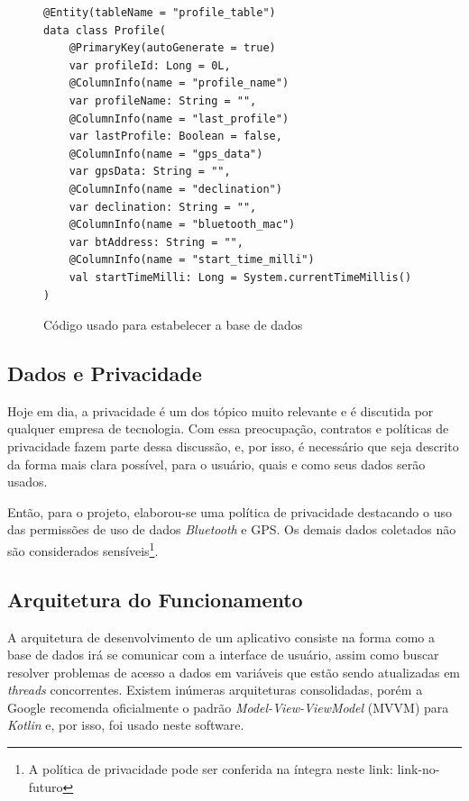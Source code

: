 \begin{figure}[htb]
	\centering
	\caption{Código usado para estabelecer a base de dados}
	\vspace{-15pt}
\begin{verbatim}
@Entity(tableName = "profile_table")
data class Profile(
	@PrimaryKey(autoGenerate = true)
	var profileId: Long = 0L,
	@ColumnInfo(name = "profile_name")
	var profileName: String = "",
	@ColumnInfo(name = "last_profile")
	var lastProfile: Boolean = false,
	@ColumnInfo(name = "gps_data")
	var gpsData: String = "",
	@ColumnInfo(name = "declination")
	var declination: String = "",
	@ColumnInfo(name = "bluetooth_mac")
	var btAddress: String = "",
	@ColumnInfo(name = "start_time_milli")
	val startTimeMilli: Long = System.currentTimeMillis()
)
\end{verbatim}

\label{code:database}
	\vspace{-20pt}
\end{figure}


\subsection{Dados e Privacidade}

Hoje em dia, a privacidade é um dos tópico muito relevante e é discutida por qualquer empresa de tecnologia. Com essa preocupação, contratos e políticas de privacidade fazem parte dessa discussão, e, por isso, é necessário que seja descrito da forma mais clara possível, para o usuário, quais e como seus dados serão usados.

Então, para o projeto, elaborou-se uma política de privacidade destacando o uso das permissões de uso de dados \textit{Bluetooth} e GPS. Os demais dados coletados não são considerados sensíveis\footnote{A política de privacidade pode ser conferida na íntegra neste link: link-no-futuro}.

\subsection{Arquitetura do Funcionamento}

A arquitetura de desenvolvimento de um aplicativo consiste na forma como a base de dados irá se comunicar com a interface de usuário, assim como buscar resolver problemas de acesso a dados em variáveis que estão sendo atualizadas em \textit{threads} concorrentes. Existem inúmeras arquiteturas consolidadas, porém a Google recomenda oficialmente o padrão \textit{Model-View-ViewModel} (MVVM) para \textit{Kotlin} e, por isso, foi usado neste software.

